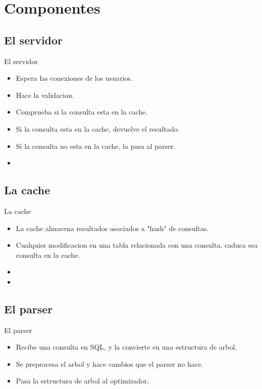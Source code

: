 \section{Componentes}
\subsection{El servidor}
\begin{frame}{El servidor}
  \begin{itemize}
    \item Espera las conexiones de los usuarios.
    \item Hace la validacion.
    \item Comprueba si la consulta esta en la cache.
    \item Si la consulta esta en la cache, devuelve el resultado.
    \item Si la consulta no esta en la cache, la pasa al parser.
    \item 
  \end{itemize}
\end{frame}

\subsection{La cache}
\begin{frame}{La cache}
  \begin{itemize}
    \item La cache almacena resultados asociados a "hash" de consultas.
    \item Cualquier modificacion en una tabla relacionada con una consulta, caduca esa consulta en la cache.
    \item 
    \item 
  \end{itemize}
\end{frame}

\subsection{El parser}
\begin{frame}{El parser}
  \begin{itemize}
    \item Recibe una consulta en SQL, y la convierte en una estructura de arbol.
    \item Se preprocesa el arbol y hace cambios que el parser no hace.
    \item Pasa la estructura de arbol al optimizador.
  \end{itemize}
\end{frame}

